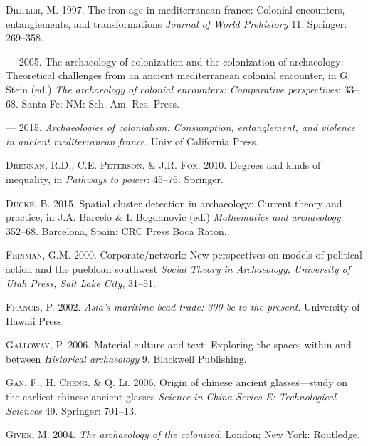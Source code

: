 \documentclass[]{article}
\begin{document}
\leavevmode\hypertarget{ref-Dietler1997}{}%
\textsc{Dietler}, M. 1997. The iron age in mediterranean france:
Colonial encounters, entanglements, and transformations \emph{Journal of
World Prehistory} 11. Springer: 269--358.

\leavevmode\hypertarget{ref-Dietler2005}{}%
--- 2005. The archaeology of colonization and the colonization of
archaeology: Theoretical challenges from an ancient mediterranean
colonial encounter, in G. Stein (ed.) \emph{The archaeology of colonial
encounters: Comparative perspectives}: 33--68. Santa Fe: NM: Sch. Am.
Res. Press.

\leavevmode\hypertarget{ref-Dietler2015}{}%
--- 2015. \emph{Archaeologies of colonialism: Consumption, entanglement,
and violence in ancient mediterranean france}. Univ of California Press.

\leavevmode\hypertarget{ref-Drennan2010}{}%
\textsc{Drennan}, R.D., C.E. \textsc{Peterson}. \& J.R. \textsc{Fox}.
2010. Degrees and kinds of inequality, in \emph{Pathways to power}:
45--76. Springer.

\leavevmode\hypertarget{ref-Ducke2015}{}%
\textsc{Ducke}, B. 2015. Spatial cluster detection in archaeology:
Current theory and practice, in J.A. Barcelo \& I. Bogdanovic (ed.)
\emph{Mathematics and archaeology}: 352--68. Barcelona, Spain: CRC Press
Boca Raton.

\leavevmode\hypertarget{ref-Feinman2000}{}%
\textsc{Feinman}, G.M. 2000. Corporate/network: New perspectives on
models of political action and the puebloan southwest \emph{Social
Theory in Archaeology, University of Utah Press, Salt Lake City},
31--51.

\leavevmode\hypertarget{ref-Francis2002}{}%
\textsc{Francis}, P. 2002. \emph{Asia's maritime bead trade: 300 bc to
the present}. University of Hawaii Press.

\leavevmode\hypertarget{ref-Galloway2006}{}%
\textsc{Galloway}, P. 2006. Material culture and text: Exploring the
spaces within and between \emph{Historical archaeology} 9. Blackwell
Publishing.

\leavevmode\hypertarget{ref-Gan2006}{}%
\textsc{Gan}, F., H. \textsc{Cheng}. \& Q. \textsc{Li}. 2006. Origin of
chinese ancient glasses---study on the earliest chinese ancient glasses
\emph{Science in China Series E: Technological Sciences} 49. Springer:
701--13.

\leavevmode\hypertarget{ref-Given2004}{}%
\textsc{Given}, M. 2004. \emph{The archaeology of the colonized}.
London; New York: Routledge.
\end{document}
